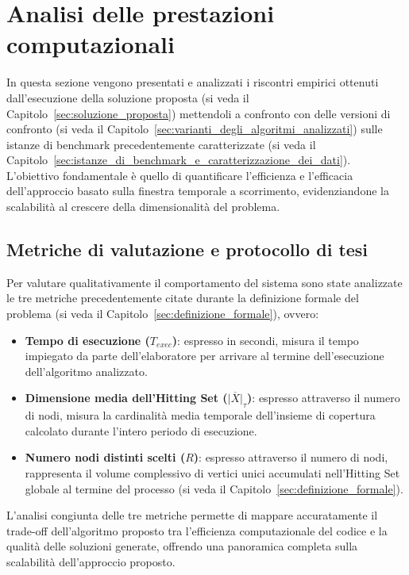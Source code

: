 
\section{Analisi delle prestazioni computazionali}\label{sec:analisi_delle_presentazioni_computazionali}

In questa sezione vengono presentati e analizzati i riscontri empirici ottenuti dall'esecuzione della soluzione proposta (si veda il Capitolo~\ref{sec:soluzione_proposta}) mettendoli a confronto con delle versioni di confronto (si veda il Capitolo~\ref{sec:varianti_degli_algoritmi_analizzati}) sulle istanze di benchmark precedentemente caratterizzate (si veda il Capitolo~\ref{sec:istanze_di_benchmark_e_caratterizzazione_dei_dati}).
L'obiettivo fondamentale è quello di quantificare l'efficienza e l'efficacia dell'approccio basato sulla finestra temporale a scorrimento, evidenziandone la scalabilità al crescere della dimensionalità del problema.

\subsection{Metriche di valutazione e protocollo di tesi}

Per valutare qualitativamente il comportamento del sistema sono state analizzate le tre metriche precedentemente citate durante la definizione formale del problema (si veda il Capitolo~\ref{sec:definizione_formale}), ovvero:
\begin{itemize}
    \item \textbf{Tempo di esecuzione ($T_{exec}$)}: espresso in secondi, misura il tempo impiegato da parte dell'elaboratore per arrivare al termine dell'esecuzione dell'algoritmo analizzato.
    \item \textbf{Dimensione media dell'Hitting Set ($\overline{|X|}_{\tau}$)}: espresso attraverso il numero di nodi, misura la cardinalità media temporale dell'insieme di copertura calcolato durante l'intero periodo di esecuzione.
    \item \textbf{Numero nodi distinti scelti ($R$)}: espresso attraverso il numero di nodi, rappresenta il volume complessivo di vertici unici accumulati nell'Hitting Set globale al termine del processo (si veda il Capitolo~\ref{sec:definizione_formale}).
\end{itemize}
L'analisi congiunta delle tre metriche permette di mappare accuratamente il trade-off dell'algoritmo proposto tra l'efficienza computazionale del codice e la qualità delle soluzioni generate, offrendo una panoramica completa sulla scalabilità dell'approccio proposto.

